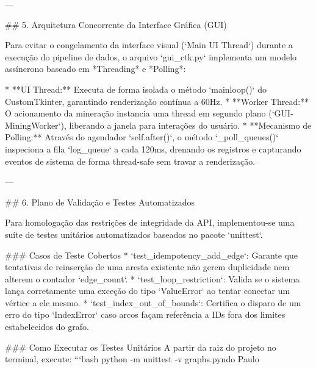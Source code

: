 ---

## 5. Arquitetura Concorrente da Interface Gráfica (GUI)

Para evitar o congelamento da interface visual (`Main UI Thread`) durante a execução do pipeline de dados, o arquivo `gui_ctk.py` implementa um modelo assíncrono baseado em *Threading* e *Polling*:

* **UI Thread:** Executa de forma isolada o método `mainloop()` do CustomTkinter, garantindo renderização contínua a 60Hz.
* **Worker Thread:** O acionamento da mineração instancia uma thread em segundo plano (`GUI-MiningWorker`), liberando a janela para interações do usuário.
* **Mecanismo de Polling:** Através do agendador `self.after()`, o método `_poll_queues()` inspeciona a fila `log_queue` a cada 120ms, drenando os registros e capturando eventos de sistema de forma thread-safe sem travar a renderização.

---

## 6. Plano de Validação e Testes Automatizados

Para homologação das restrições de integridade da API, implementou-se uma suíte de testes unitários automatizados baseados no pacote `unittest`.

### Casos de Teste Cobertos
* `test_idempotency_add_edge`: Garante que tentativas de reinserção de uma aresta existente não gerem duplicidade nem alterem o contador `edge_count`.
* `test_loop_restriction`: Valida se o sistema lança corretamente uma exceção do tipo `ValueError` ao tentar conectar um vértice a ele mesmo.
* `test_index_out_of_bounds`: Certifica o disparo de um erro do tipo `IndexError` caso arcos façam referência a IDs fora dos limites estabelecidos do grafo.

### Como Executar os Testes Unitários
A partir da raiz do projeto no terminal, execute:
```bash
python -m unittest -v graphs.pyndo Paulo
